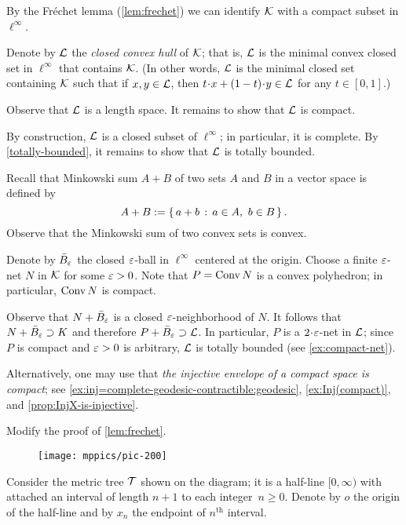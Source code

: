 \setcounter{eqtn}{0}

By the Fréchet lemma (\ref{lem:frechet}) we can identify $\mathcal{K}$ with a compact subset in $\ell^\infty$.

Denote by $\mathcal{L}$ the \emph{closed convex hull} of $\mathcal{K}$;
that is, $\mathcal{L}$ is the minimal convex closed set in $\ell^\infty$ that contains $\mathcal{K}$.
(In other words, $\mathcal{L}$ is the minimal closed set containing $\mathcal{K}$ such that if $x,y\in \mathcal{L}$, then 
$t\cdot x+(1-t)\cdot y\in \spc{L}$ for any $t\in[0,1]$.)

Observe that $\mathcal{L}$ is a length space.
It remains to show that $\mathcal{L}$ is compact.

By construction, $\mathcal{L}$ is a closed subset of $\ell^\infty$; in particular, it is complete.
By \ref{totally-bounded}, it remains to show that $\mathcal{L}$ is totally bounded.

Recall that Minkowski sum $A + B$ of two sets $A$ and $B$ in a vector space is defined by
\[A + B 
\mathrel{:=}
\left\{\,{a+b}\,:\,{a\in A,\ b\in B}\,\right\}.\]
Observe that the Minkowski sum of two convex sets is convex.

Denote by $\bar B_\varepsilon$ the closed $\varepsilon$-ball in $\ell^\infty$ centered at the origin.
Choose a finite $\varepsilon$-net $N$ in $\mathcal{K}$ for some $\varepsilon>0$.
Note that $P=\mathop{\rm Conv}\nolimits N$ is a convex polyhedron; in particular, $\mathop{\rm Conv}\nolimits N$ is compact.

Observe that $N+\bar B_\varepsilon$ is a closed $\varepsilon$-neighborhood of $N$.
It follows that $N+\bar B_\varepsilon\supset K$ and therefore $P+\bar B_\varepsilon\supset \mathcal{L}$.
In particular, $P$ is a $2\cdot\eps$-net in $\mathcal{L}$;
since $P$ is compact and $\varepsilon>0$ is arbitrary, $\mathcal{L}$ is totally bounded (see \ref{ex:compact-net}).

Alternatively, one may use that \textit{the injective envelope of a compact space is compact}; see \ref{ex:inj=complete-geodesic-contractible:geodesic}, \ref{ex:Inj(compact)}, and \ref{prop:InjX-is-injective}.

Modify the proof of \ref{lem:frechet}.

\begin{wrapfigure}{r}{23mm}
\vskip-6mm
\centering
\texttt{[image: mppics/pic-200]}
\end{wrapfigure}

Consider the metric tree $\mathcal{T}$ shown on the diagram;
it is a half-line $[0,\infty)$ with attached an interval of length $n+1$ to each integer~$n\ge 0$.
Denote by $o$ the origin of the half-line
and by $x_n$ the endpoint of $n^{\text{th}}$ interval.

